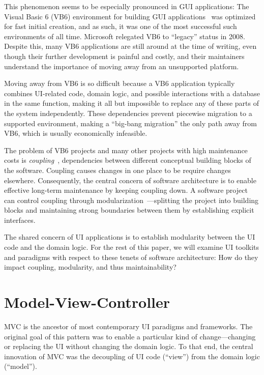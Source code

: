 \documentclass[sigplan,review,screen]{acmart}
\begin{document}
This phenomenon seems to be especially pronounced in GUI applications:
The Visual Basic 6 (VB6) environment for building GUI
applications~\cite{VB6} was optimized for fast initial creation, and
as such, it was one of the most successful such environments of all time.
Microsoft relegated VB6 to ``legacy'' status in 2008. Despite this,
many VB6 applications are still around at the time of writing, even
though their further development is painful and costly, and their
maintainers understand the importance of moving away from an
unsupported platform.

Moving away from VB6 is so difficult because a VB6 application
typically combines UI-related code, domain logic, and possible
interactions with a database in the same function, making it
all but impossible to replace any of these parts of the system
independently.  These dependencies prevent piecewise migration to a
supported environment, making a ``big-bang migration'' the only
path away from VB6, which is usually economically
infeasible.

The problem of VB6 projects and many other projects with
high maintenance costs is \textit{coupling}~\cite{GreenBook},
dependencies between different conceptual building blocks of the
software. Coupling causes changes in one place to be require changes 
elsewhere.  Consequently, the central concern of software
architecture is to enable effective long-term maintenance by keeping
coupling down.  A software project can control coupling through 
{modularization}~\cite{Modularity}---splitting the
project into building blocks and maintaining strong boundaries between
them by establishing explicit interfaces.

The shared concern of UI applications is to establish modularity
between the UI code and the domain logic.  For the rest of this paper, we will examine UI toolkits and paradigms
with respect to these tenets of software architecture: How do they
impact coupling, modularity, and thus maintainability?  


\section{Model-View-Controller}
\label{sec:mvc}
  

MVC is the ancestor of most contemporary UI paradigms and frameworks.
The original goal of this pattern was to enable a particular kind of
change---changing or replacing the UI without changing the domain
logic.  To that end, the central innovation of MVC was the decoupling
of UI code (``view'') from the domain logic (``model'').
\end{document}
